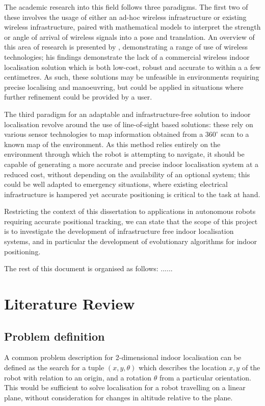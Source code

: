 \documentclass[authoryearcitations]{UoYCSproject}
\begin{document}
The academic research into this field follows three paradigms. The first two of these involves the usage of either an ad-hoc wireless infrastructure or existing wireless infrastructure, paired with mathematical models to interpret the strength or angle of arrival of wireless signals into a pose and translation. An overview of this area of research is presented by \citet{Liu2007-in}, demonstrating a range of use of wireless technologies; his findings demonstrate the lack of a commercial wireless indoor localisation solution which is both low-cost, robust and accurate to within a a few centimetres. As such, these solutions may be unfeasible in environments requiring precise localising and manoeuvring, but could be applied in situations where further refinement could be provided by a user. 

The third paradigm for an adaptable and infrastructure-free solution to indoor localisation revolve around the use of line-of-sight based solutions: these rely on various sensor technologies to map information obtained from a  $360^{\circ}$ scan to a known map of the environment. As this method relies entirely on the environment through which the robot is attempting to navigate, it should be capable of generating a more accurate and precise indoor localisation system at a reduced cost, without depending on the availability of an optional system; this could be well adapted to emergency situations, where existing electrical infrastructure is hampered yet accurate positioning is critical to the task at hand. 


Restricting the context of this dissertation to applications in autonomous robots requiring accurate positional tracking, we can state that the scope of this project is to investigate the development of infrastructure free indoor localisation systems, and in particular the development of evolutionary algorithms for indoor positioning.

The rest of this document is organised as follows: ......


\chapter{Literature Review}

\section{Problem definition}
A common problem description for 2-dimensional indoor localisation can be defined as the search for a tuple $(x, y, \theta)$ which describes the location $x, y$ of the robot with relation to an origin, and a rotation $\theta$ from a particular orientation. This would be sufficient to solve localisation for a robot travelling on a linear plane, without consideration for changes in altitude relative to the plane.
\end{document}
